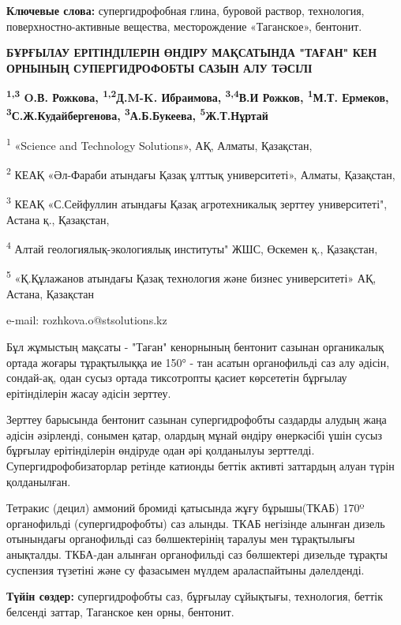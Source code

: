 {\bfseries Ключевые слова:} супергидрофобная глина, буровой раствор,
технология, поверхностно-активные вещества, месторождение «Таганское»,
бентонит.

\begin{center}
{\large\bfseries БҰРҒЫЛАУ ЕРІТІНДІЛЕРІН ӨНДІРУ МАҚСАТЫНДА "ТАҒАН" КЕН ОРНЫНЫҢ СУПЕРГИДРОФОБТЫ САЗЫН АЛУ ТӘСІЛІ}

{\bfseries \textsuperscript{1,3} O.В. Рожкова, \textsuperscript{1,2}Д.M-K.
Ибраимова, \textsuperscript{3,4}В.И Рожков, \textsuperscript{1}М.Т.
Ермеков, \textsuperscript{3}С.Ж.Кудайбергенова,
\textsuperscript{3}А.Б.Букеева, \textsuperscript{5}Ж.Т.Нұртай}

\textsuperscript{1} «Science and Technology Solutions», АҚ, Алматы,
Қазақстан,

\textsuperscript{2} КЕАҚ «Әл-Фараби атындағы Қазақ ұлттық университеті»,
Алматы, Қазақстан,

\textsuperscript{3} КЕАҚ «С.Сейфуллин атындағы Қазақ агротехникалық
зерттеу университеті", Астана қ., Қазақстан,

\textsuperscript{4} Алтай геологиялық-экологиялық институты" ЖШС,
Өскемен қ., Қазақстан,

\textsuperscript{5} «Қ.Құлажанов атындағы Қазақ технология және бизнес
университеті» АҚ, Астана, Қазақстан

e-mail: rozhkova.o@stsolutions.kz
\end{center}

Бұл жұмыстың мақсаты - "Таған" кенорнының бентонит сазынан органикалық
ортада жоғары тұрақтылыққа ие 150° - тан асатын органофильді саз алу
әдісін, сондай-ақ, одан сусыз ортада тиксотропты қасиет көрсететін
бұрғылау ерітінділерін жасау әдісін зерттеу.

Зерттеу барысында бентонит сазынан супергидрофобты саздарды алудың жаңа
әдісін әзірленді, сонымен қатар, олардың мұнай өндіру өнеркәсібі үшін
сусыз бұрғылау ерітінділерін өндіруде одан әрі қолданылуы зерттелді.
Супергидрофобизаторлар ретінде катионды беттік активті заттардың алуан
түрін қолданылған.

Тетракис (децил) аммоний бромиді қатысында жұғу бұрышы(ТКАБ) 170º
органофильді (супергидрофобты) саз алынды. ТКАБ негізінде алынған дизель
отынындағы органофильді саз бөлшектерінің таралуы мен тұрақтылығы
анықталды. ТКБА-дан алынған органофильді саз бөлшектері дизельде тұрақты
суспензия түзетіні және су фазасымен мүлдем араласпайтыны дәлелденді.

{\bfseries Түйін сөздер:} супергидрофобты саз, бұрғылау сұйықтығы,
технология, беттік белсенді заттар, Таганское кен орны, бентонит.

